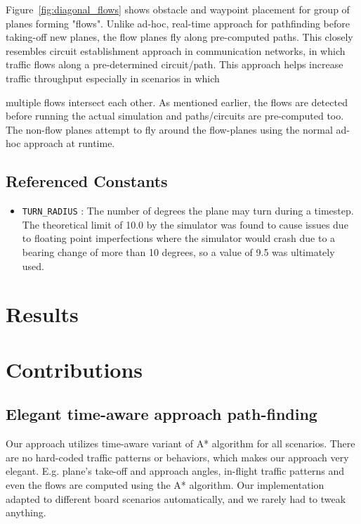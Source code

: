 \documentclass[10pt]{article}
\newcommand{\ms}[1] {
  \texttt{#1}
}
\begin{document}
Figure~\ref{fig:diagonal_flows} shows obstacle and waypoint placement
for group of planes forming "flows". Unlike ad-hoc, real-time approach for
pathfinding before taking-off new planes, the flow planes fly along pre-computed
paths. This closely resembles circuit establishment approach in communication
networks, in which traffic flows along a pre-determined circuit/path. This
approach helps increase traffic throughput especially in scenarios in which

multiple flows intersect each other. As mentioned earlier, the flows are
detected before running the actual simulation and paths/circuits are
pre-computed too. The non-flow planes attempt to fly around the flow-planes
using the normal ad-hoc approach at runtime.



\subsection{Referenced Constants}
\begin{itemize}
  \item \ms{TURN\_RADIUS}: The number of degrees the plane may turn during a timestep. The theoretical limit of 
    10.0 by the simulator was found to cause issues due to floating point imperfections where the simulator would
    crash due to a bearing change of more than 10 degrees, so a value of 9.5 was ultimately used.
\end{itemize}


\newpage
\section{Results}

\newpage
\section{Contributions}

\subsection{Elegant time-aware approach path-finding}

Our approach utilizes time-aware variant of A* algorithm for all scenarios.
There are no hard-coded traffic patterns or behaviors, which makes our approach
very elegant. E.g. plane's take-off and approach angles, in-flight traffic
patterns and even the flows are computed using the A* algorithm. Our
implementation adapted to different board scenarios automatically, and we rarely
had to tweak anything.
\end{document}
